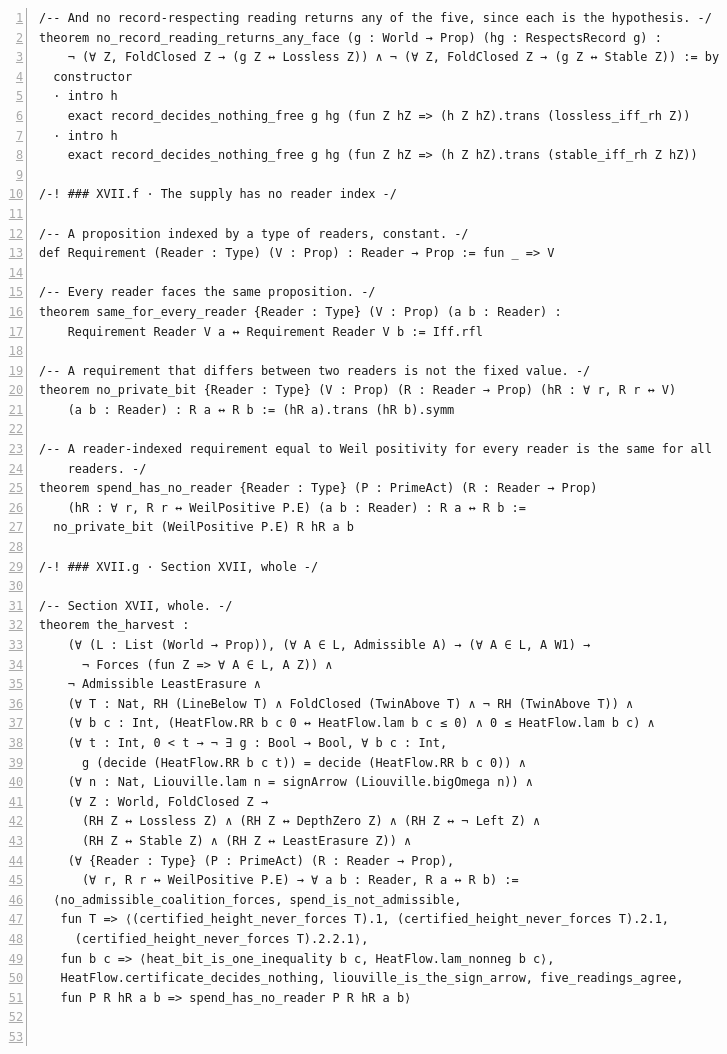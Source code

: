 \documentclass[10pt]{article}
\newcommand{\leansize}{\fontsize{5.5pt}{6.75pt}\selectfont}
\begin{document}
\begin{multicols}{2}
\begin{Verbatim}[numbers=left,firstnumber=1,numbersep=3pt,xleftmargin=2.6em,breaklines=true,breakanywhere=true,breakautoindent=false,breakindent=1.4em,breaksymbolleft={},breakanywheresymbolpre={},fontsize=\leansize]
/-- And no record-respecting reading returns any of the five, since each is the hypothesis. -/
theorem no_record_reading_returns_any_face (g : World → Prop) (hg : RespectsRecord g) :
    ¬ (∀ Z, FoldClosed Z → (g Z ↔ Lossless Z)) ∧ ¬ (∀ Z, FoldClosed Z → (g Z ↔ Stable Z)) := by
  constructor
  · intro h
    exact record_decides_nothing_free g hg (fun Z hZ => (h Z hZ).trans (lossless_iff_rh Z))
  · intro h
    exact record_decides_nothing_free g hg (fun Z hZ => (h Z hZ).trans (stable_iff_rh Z hZ))

/-! ### XVII.f · The supply has no reader index -/

/-- A proposition indexed by a type of readers, constant. -/
def Requirement (Reader : Type) (V : Prop) : Reader → Prop := fun _ => V

/-- Every reader faces the same proposition. -/
theorem same_for_every_reader {Reader : Type} (V : Prop) (a b : Reader) :
    Requirement Reader V a ↔ Requirement Reader V b := Iff.rfl

/-- A requirement that differs between two readers is not the fixed value. -/
theorem no_private_bit {Reader : Type} (V : Prop) (R : Reader → Prop) (hR : ∀ r, R r ↔ V)
    (a b : Reader) : R a ↔ R b := (hR a).trans (hR b).symm

/-- A reader-indexed requirement equal to Weil positivity for every reader is the same for all
    readers. -/
theorem spend_has_no_reader {Reader : Type} (P : PrimeAct) (R : Reader → Prop)
    (hR : ∀ r, R r ↔ WeilPositive P.E) (a b : Reader) : R a ↔ R b :=
  no_private_bit (WeilPositive P.E) R hR a b

/-! ### XVII.g · Section XVII, whole -/

/-- Section XVII, whole. -/
theorem the_harvest :
    (∀ (L : List (World → Prop)), (∀ A ∈ L, Admissible A) → (∀ A ∈ L, A W1) →
      ¬ Forces (fun Z => ∀ A ∈ L, A Z)) ∧
    ¬ Admissible LeastErasure ∧
    (∀ T : Nat, RH (LineBelow T) ∧ FoldClosed (TwinAbove T) ∧ ¬ RH (TwinAbove T)) ∧
    (∀ b c : Int, (HeatFlow.RR b c 0 ↔ HeatFlow.lam b c ≤ 0) ∧ 0 ≤ HeatFlow.lam b c) ∧
    (∀ t : Int, 0 < t → ¬ ∃ g : Bool → Bool, ∀ b c : Int,
      g (decide (HeatFlow.RR b c t)) = decide (HeatFlow.RR b c 0)) ∧
    (∀ n : Nat, Liouville.lam n = signArrow (Liouville.bigOmega n)) ∧
    (∀ Z : World, FoldClosed Z →
      (RH Z ↔ Lossless Z) ∧ (RH Z ↔ DepthZero Z) ∧ (RH Z ↔ ¬ Left Z) ∧
      (RH Z ↔ Stable Z) ∧ (RH Z ↔ LeastErasure Z)) ∧
    (∀ {Reader : Type} (P : PrimeAct) (R : Reader → Prop),
      (∀ r, R r ↔ WeilPositive P.E) → ∀ a b : Reader, R a ↔ R b) :=
  ⟨no_admissible_coalition_forces, spend_is_not_admissible,
   fun T => ⟨(certified_height_never_forces T).1, (certified_height_never_forces T).2.1,
     (certified_height_never_forces T).2.2.1⟩,
   fun b c => ⟨heat_bit_is_one_inequality b c, HeatFlow.lam_nonneg b c⟩,
   HeatFlow.certificate_decides_nothing, liouville_is_the_sign_arrow, five_readings_agree,
   fun P R hR a b => spend_has_no_reader P R hR a b⟩



\end{Verbatim}
\end{multicols}
\end{document}
